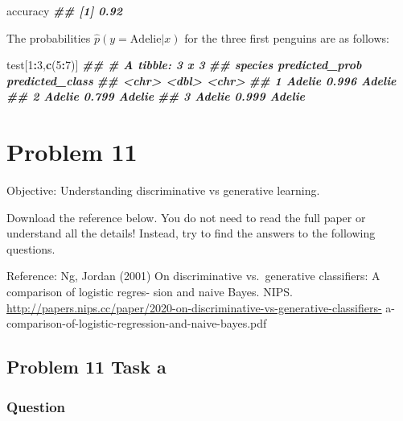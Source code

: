 \documentclass[
]{article}
\newenvironment{Shaded}{\begin{snugshade}}{\end{snugshade}}
\newcommand{\DecValTok}[1]{\textcolor[rgb]{0.00,0.00,0.81}{#1}}
\newcommand{\DocumentationTok}[1]{\textcolor[rgb]{0.56,0.35,0.01}{\textbf{\textit{#1}}}}
\newcommand{\FunctionTok}[1]{\textcolor[rgb]{0.13,0.29,0.53}{\textbf{#1}}}
\newcommand{\NormalTok}[1]{#1}
\newcommand{\SpecialCharTok}[1]{\textcolor[rgb]{0.81,0.36,0.00}{\textbf{#1}}}
\begin{document}
\begin{Shaded}
\begin{Highlighting}[]
\NormalTok{accuracy}
\DocumentationTok{\#\# [1] 0.92}
\end{Highlighting}
\end{Shaded}

The probabilities \(\hat{p}(y = \text{Adelie} | x)\) for the three first
penguins are as follows:

\begin{Shaded}
\begin{Highlighting}[]
\NormalTok{test[}\DecValTok{1}\SpecialCharTok{:}\DecValTok{3}\NormalTok{,}\FunctionTok{c}\NormalTok{(}\DecValTok{5}\SpecialCharTok{:}\DecValTok{7}\NormalTok{)]}
\DocumentationTok{\#\# \# A tibble: 3 x 3}
\DocumentationTok{\#\#   species predicted\_prob predicted\_class}
\DocumentationTok{\#\#   \textless{}chr\textgreater{}            \textless{}dbl\textgreater{} \textless{}chr\textgreater{}          }
\DocumentationTok{\#\# 1 Adelie           0.996 Adelie         }
\DocumentationTok{\#\# 2 Adelie           0.799 Adelie         }
\DocumentationTok{\#\# 3 Adelie           0.999 Adelie}
\end{Highlighting}
\end{Shaded}

\hypertarget{problem-11}{%
\section{Problem 11}\label{problem-11}}

Objective: Understanding discriminative vs generative learning.

Download the reference below. You do not need to read the full paper or
understand all the details! Instead, try to find the answers to the
following questions.

Reference: Ng, Jordan (2001) On discriminative vs.~generative
classifiers: A comparison of logistic regres- sion and naive Bayes.
NIPS.
\url{http://papers.nips.cc/paper/2020-on-discriminative-vs-generative-classifiers-}
a-comparison-of-logistic-regression-and-naive-bayes.pdf

\hypertarget{problem-11-task-a}{%
\subsection{Problem 11 Task a}\label{problem-11-task-a}}

\hypertarget{question-5}{%
\subsubsection{Question}\label{question-5}}
\end{document}
